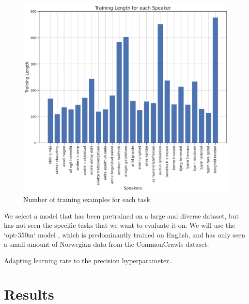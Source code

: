 \documentclass{article}
\begin{document}
\begin{figure}[h] \label{fig:task_len}
    \centering
    \includegraphics[width=\textwidth]{figures/training_lengths.png}
    \caption{Number of training examples for each task}
    \label{fig:training_lengths}
\end{figure}

We select a model that has been pretrained on a large and diverse dataset, but has not seen the specific tasks that we want to evaluate it on. We will use the `opt-350m` model \cite{zhang_opt_2022}, which is predominantly trained on English, and has only seen a small amount of Norwegian data from the CommonCrawls dataset.

Adapting learning rate to the precision hyperparameter..

\section{Results}
\end{document}
